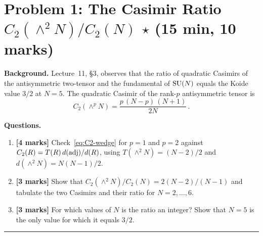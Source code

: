 \documentclass[11pt,a4paper]{article}
\begin{document}
\section*{Problem 1: The Casimir Ratio $C_2(\wedge^2 N)/C_2(N)$
  \hfill $\star$ \normalsize(15 min, 10 marks)}
\label{prob:casimir}

\noindent\textbf{Background.}
Lecture~11, \S3, observes that the ratio of quadratic Casimirs of the
antisymmetric two-tensor and the fundamental of $\mathrm{SU}(N)$ equals the
Koide value $3/2$ at $N = 5$.  The quadratic Casimir of the rank-$p$
antisymmetric tensor is
\begin{equation}\label{eq:C2-wedge}
  C_2(\wedge^p N) = \frac{p\,(N-p)\,(N+1)}{2N}\,.
\end{equation}

\medskip

\noindent\textbf{Questions.}
\begin{enumerate}[label=(\alph*)]
  \item \textbf{[4 marks]}
    Check~\eqref{eq:C2-wedge} for $p = 1$ and $p = 2$ against
    $C_2(R) = T(R)\,d(\mathrm{adj})/d(R)$, using
    $T(\wedge^2 N) = (N-2)/2$ and $d(\wedge^2 N) = N(N-1)/2$.
  \item \textbf{[3 marks]}
    Show that $C_2(\wedge^2 N)/C_2(N) = 2(N-2)/(N-1)$ and tabulate the
    two Casimirs and their ratio for $N = 2,\dots,6$.
  \item \textbf{[3 marks]}
    For which values of $N$ is the ratio an integer?  Show that $N = 5$
    is the only value for which it equals $3/2$.
\end{enumerate}


\bigskip
\hrule
\bigskip
\end{document}
